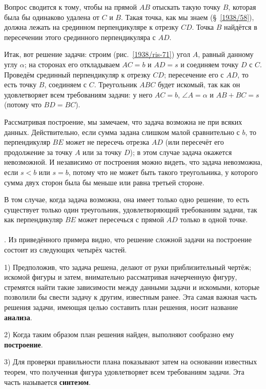 \documentclass[twoside]{book}
\begin{document}
Вопрос сводится к тому, чтобы на прямой $AB$ отыскать такую точку $B$, которая была бы одинаково удалена от $C$ и $B$.
Такая точка, как мы знаем (§~\ref{1938/58}), должна лежать на срединном перпендикуляре к отрезку $CD$. 
Точка $B$ найдётся в пересечении этого срединного перпендикуляра с $AD$. 

Итак, вот решение задачи:
строим (рис.~\ref{1938/ris-71}) угол $A$, равный данному углу $\alpha$;
на сторонах его откладываем $AC=b$ и $AD=s$ и соединяем точку $D$ с $C$.
Проведём срединный перпендикуляр к отрезку $CD$;
пересечение его с $AD$, то есть точку $B$, соединяем с $C$.
Треугольник $ABC$ будет  искомый, так как он удовлетворяет всем требованиям задачи:
у него $AC=b$, $\angle A = \alpha$ и $AB+BC=s$ (потому что $BD=BC$).

Рассматривая построение, мы замечаем, что задача возможна не при всяких данных.
Действительно, если сумма задана слишком малой сравнительно с $b$, то перпендикуляр $BE$ может не пересечь отрезка $AD$ (или пересечёт его продолжение за точку $A$ или за точку $D$);
в этом случае задача окажется невозможной.
И независимо от построения можно видеть, что задача невозможна, если $s<b$ или $s=b$, потому что не может быть такого треугольника, у которого сумма двух сторон была бы меньше или равна третьей стороне.

В том случае, когда задача возможна, она имеет только одно решение, то есть существует только один треугольник, удовлетворяющий требованиям задачи, так как перпендикуляр $BE$ может пересечься с прямой $AD$ только в одной точке.

\paragraph{}\label{1938/69}
.
Из приведённого примера видно, что решение сложной задачи на построение состоит из следующих четырёх частей.

1) Предположив, что задача решена, делают от руки приблизительный чертёж;
искомой фигуры и затем, внимательно рассматривая начерченную фигуру, стремятся найти такие зависимости между данными задачи и искомыми, которые позволили бы свести задачу к другим, известным ранее.
Эта самая важная часть решения задачи, имеющая целью составить план решения, носит название \textbf{анализа}.

2) Когда таким образом план решения найден, выполняют сообразно ему \textbf{построение}.

3) Для проверки правильности плана показывают затем на основании известных теорем, что полученная фигура удовлетворяет всем требованиям задачи.
Эта часть называется \textbf{синтезом}.
\end{document}
